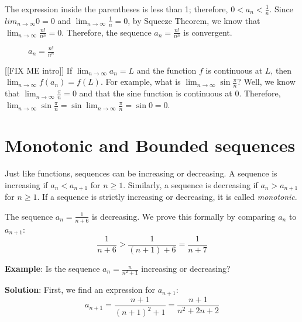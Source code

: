 The expression inside the parentheses is less than 1; therefore, $0 < a_n < 
\frac{1}{n}$. Since $lim_{n \to \infty} 0 = 0$ and $\lim_{n \to \infty} 
\frac{1}{n} = 0$, by Squeeze Theorem, we know that $\lim_{n \to \infty} 
\frac{n!}{n^n} = 0$. Therefore, the sequence $a_n = \frac{n!}{n^n}$ is 
convergent. 

\begin{figure}[htbp]
\centering
    \caption{$a_n = \frac{n!}{n^n}$}
    \label{fig:factorial}
\end{figure}

[[FIX ME intro]]
If $\lim_{n \to \infty} a_n = L$ and the function $f$ is continuous at $L$, 
then $\lim_{n \to \infty} f(a_n) = f(L)$. For example, what is $\lim_{n \to 
\infty} \sin{\frac{\pi}{n}}$? Well, we know that $\lim_{n \to \infty} 
\frac{\pi}{n} = 0$ and that the sine function is continuous at 0. Therefore, 
$\lim_{n \to \infty} \sin{\frac{\pi}{n}} = \sin{\lim_{n \to \infty} 
\frac{\pi}{n}} = \sin{0} = 0$. 

\section{Monotonic and Bounded sequences}
Just like functions, sequences can be increasing or decreasing. A sequence is 
increasing if $a_n < a_{n+1}$ for $n \geq 1$. Similarly, a sequence is 
decreasing if $a_n > a_{n+1}$ for $n \geq 1$. If a sequence is strictly 
increasing or decreasing, it is called \textit{monotonic}. 

The sequence $a_n = \frac{1}{n + 6}$ is decreasing. We prove this formally by 
comparing $a_n$ to $a_{n+1}$:
$$\frac{1}{n + 6} > \frac{1}{(n + 1) + 6} = \frac{1}{n + 7}$$

\textbf{Example}: Is the sequence $a_n = \frac{n}{n^2 + 1}$ increasing or 
decreasing? 

\textbf{Solution}: First, we find an expression for $a_{n+1}$:
$$a_{n + 1} = \frac{n + 1}{(n + 1)^2 + 1} = \frac{n + 1}{n^2 + 2n + 2}$$

